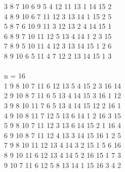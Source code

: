 {3 8 7 10 6 9 5 4 12 11 13 1 14 15 2\\
4 8 9 10 6 7 11 12 3 13 14 1 15 2 5\\
5 8 7 6 10 9 11 3 12 13 2 4 14 15 1\\
6 8 9 7 10 11 12 5 13 4 14 1 2 3 15 \\
7 8 9 5 10 11 4 12 3 13 14 15 1 2 6\\
8 9 10 6 5 11 4 7 12 2 13 14 15 1 3\\
\\
n = 16\\
1 9 8 10 7 11 6 12 13 5 4 15 2 3 16 14\\
2 9 10 8 7 11 6 5 13 4 14 15 3 16 1 12\\
3 9 8 10 11 7 6 5 13 4 14 15 12 2 16 1\\
4 9 10 8 11 7 12 5 13 6 14 1 2 16 3 15\\
5 9 8 10 7 11 12 3 13 6 14 15 2 1 16 4\\
6 9 10 8 7 11 12 4 13 3 14 15 16 1 2 5\\
7 9 8 10 11 12 13 4 14 3 2 15 1 5 6 16 \\
8 9 10 11 6 12 13 4 14 5 2 16 15 1 7 3\\
9 10 7 11 6 12 5 8 13 14 1 15 16 3 4 2\\
}
